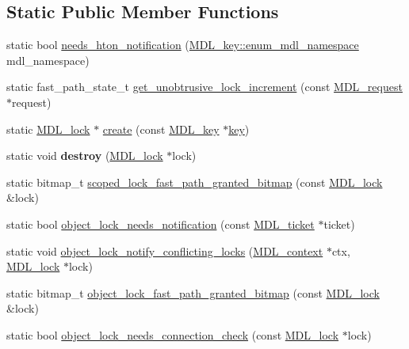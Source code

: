 \subsection*{Static Public Member Functions}
\begin{DoxyCompactItemize}
\item 
static bool \mbox{\hyperlink{classMDL__lock_aa6cbff270ec3afad0feba7e97e9747bb}{needs\+\_\+hton\+\_\+notification}} (\mbox{\hyperlink{structMDL__key_a391ec4bd98fec6852a48f7856546ed3b}{M\+D\+L\+\_\+key\+::enum\+\_\+mdl\+\_\+namespace}} mdl\+\_\+namespace)
\item 
static fast\+\_\+path\+\_\+state\+\_\+t \mbox{\hyperlink{classMDL__lock_aa8424d2f478663117e7ac5e435840342}{get\+\_\+unobtrusive\+\_\+lock\+\_\+increment}} (const \mbox{\hyperlink{classMDL__request}{M\+D\+L\+\_\+request}} $\ast$request)
\item 
static \mbox{\hyperlink{classMDL__lock}{M\+D\+L\+\_\+lock}} $\ast$ \mbox{\hyperlink{classMDL__lock_a3d8389ffdedfe45d4fdc22624a3ad84a}{create}} (const \mbox{\hyperlink{structMDL__key}{M\+D\+L\+\_\+key}} $\ast$\mbox{\hyperlink{classMDL__lock_aefb48179bc3f6ef64c213b253c379da4}{key}})
\item 
\mbox{\label{classMDL__lock_a0b25c48d98250c1603a5c55eeace3986}} 
static void {\bfseries destroy} (\mbox{\hyperlink{classMDL__lock}{M\+D\+L\+\_\+lock}} $\ast$lock)
\item 
static bitmap\+\_\+t \mbox{\hyperlink{classMDL__lock_a8d5ce95948e006dbe957792a4be80928}{scoped\+\_\+lock\+\_\+fast\+\_\+path\+\_\+granted\+\_\+bitmap}} (const \mbox{\hyperlink{classMDL__lock}{M\+D\+L\+\_\+lock}} \&lock)
\item 
static bool \mbox{\hyperlink{classMDL__lock_a382145d0f9b0f94a05ef03edbe922054}{object\+\_\+lock\+\_\+needs\+\_\+notification}} (const \mbox{\hyperlink{classMDL__ticket}{M\+D\+L\+\_\+ticket}} $\ast$ticket)
\item 
static void \mbox{\hyperlink{classMDL__lock_aa30406c0d7d46396e15c4ca66abc6fc7}{object\+\_\+lock\+\_\+notify\+\_\+conflicting\+\_\+locks}} (\mbox{\hyperlink{classMDL__context}{M\+D\+L\+\_\+context}} $\ast$ctx, \mbox{\hyperlink{classMDL__lock}{M\+D\+L\+\_\+lock}} $\ast$lock)
\item 
static bitmap\+\_\+t \mbox{\hyperlink{classMDL__lock_a580d9a0d9be93f90361cee67d0b4199f}{object\+\_\+lock\+\_\+fast\+\_\+path\+\_\+granted\+\_\+bitmap}} (const \mbox{\hyperlink{classMDL__lock}{M\+D\+L\+\_\+lock}} \&lock)
\item 
static bool \mbox{\hyperlink{classMDL__lock_a1ab1e1914e48faa93ba2e862cddfc274}{object\+\_\+lock\+\_\+needs\+\_\+connection\+\_\+check}} (const \mbox{\hyperlink{classMDL__lock}{M\+D\+L\+\_\+lock}} $\ast$lock)
\end{DoxyCompactItemize}
